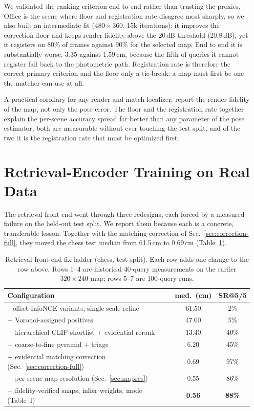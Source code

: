 \documentclass[journal]{IEEEtran}
\begin{document}
We validated the ranking criterion end to end rather than trusting the
proxies. Office is the scene where floor and registration rate disagree most
sharply, so we also built an intermediate fit ($480{\times}360$, 15k
iterations): it improves the correction floor and keeps render fidelity above the 20\,dB threshold (20.8\,dB), yet it registers on
80\% of frames against 90\% for the selected map. End to end it is substantially worse, 3.35 against 1.59\,cm, because the fifth of queries it
cannot register fall back to the photometric path. Registration rate is
therefore the correct primary criterion and the floor only a tie-break: a
map must first be one the matcher can use at all.

A practical corollary for any render-and-match localizer: report the render
fidelity of the map, not only the pose error. The floor and the registration
rate together explain the per-scene accuracy spread far better than any
parameter of the pose estimator, both are measurable without ever touching
the test split, and of the two it is the registration rate that must be
optimized first.

\section{Retrieval-Encoder Training on Real Data}
\label{sec:retrieval}

The retrieval front end went through three redesigns, each forced by a
measured failure on the held-out test split. We report them because each is a
concrete, transferable lesson. Together with the matching correction of
Sec.~\ref{sec:correction-full}, they moved the chess test median from
61.5\,cm to 0.69\,cm (Table~\ref{tab:retrieval-ladder}).

\begin{table}[t]
\caption{Retrieval-front-end fix ladder (chess, test split). Each row adds one change to the row above. Rows 1--4 are historical 40-query measurements on the earlier $320{\times}240$ map; rows 5--7 are 100-query runs.}
\label{tab:retrieval-ladder}
\centering\footnotesize
\setlength{\tabcolsep}{4pt}
\begin{tabular}{@{}lcc@{}}
\toprule
Configuration & med.\ (cm) & SR@5/5 \\
\midrule
$\pm$offset InfoNCE variants, single-scale refine & 61.50 & 2\% \\
\;+ Voronoi-assigned positives & 47.00 & 5\% \\
\;+ hierarchical CLIP shortlist + evidential rerank & 13.40 & 40\% \\
\;+ coarse-to-fine pyramid + triage & 6.20 & 45\% \\
\;+ evidential matching correction (Sec.~\ref{sec:correction-full}) & 0.69 & 97\% \\
\;+ per-scene map resolution (Sec.~\ref{sec:mapres}) & 0.55 & 86\% \\
\;+ fidelity-verified snaps, inlier weights, mode (Table~I) & \textbf{0.56} & \textbf{88\%} \\
\bottomrule
\end{tabular}
\end{table}
\end{document}
